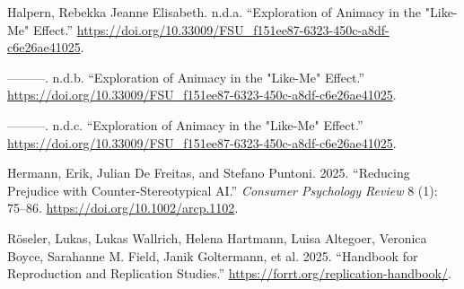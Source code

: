 \documentclass[
  letterpaper,
  DIV=11,
  numbers=noendperiod]{scrartcl}
\newlength{\cslhangindent}
\newenvironment{CSLReferences}[2] %
 {\begin{list}{}{%
  \setlength{\itemindent}{0pt}
  \setlength{\leftmargin}{0pt}
  \setlength{\parsep}{0pt}
  \ifodd #1
   \setlength{\leftmargin}{\cslhangindent}
   \setlength{\itemindent}{-1\cslhangindent}
  \fi
  \setlength{\itemsep}{#2\baselineskip}}}
 {\end{list}}
\begin{document}
\begin{CSLReferences}{1}{0}
Halpern, Rebekka Jeanne Elisabeth. n.d.a. {``Exploration of Animacy in
the {"}Like-Me{"} Effect.''}
\url{https://doi.org/10.33009/FSU_f151ee87-6323-450c-a8df-c6e26ae41025}.

---------. n.d.b. {``Exploration of Animacy in the {"}Like-Me{"}
Effect.''}
\url{https://doi.org/10.33009/FSU_f151ee87-6323-450c-a8df-c6e26ae41025}.

---------. n.d.c. {``Exploration of Animacy in the {"}Like-Me{"}
Effect.''}
\url{https://doi.org/10.33009/FSU_f151ee87-6323-450c-a8df-c6e26ae41025}.

Hermann, Erik, Julian De Freitas, and Stefano Puntoni. 2025. {``Reducing
Prejudice with Counter{-}Stereotypical AI.''} \emph{Consumer Psychology
Review} 8 (1): 75--86. \url{https://doi.org/10.1002/arcp.1102}.

Röseler, Lukas, Lukas Wallrich, Helena Hartmann, Luisa Altegoer,
Veronica Boyce, Sarahanne M. Field, Janik Goltermann, et al. 2025.
{``Handbook for {Reproduction} and {Replication} {Studies}.''}
\url{https://forrt.org/replication-handbook/}.

\end{CSLReferences}
\end{document}
